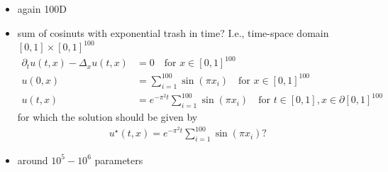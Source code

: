 \begin{itemize}
    \item again 100D
    \item sum of cosinuts with exponential trash in time? I.e.,
    time-space domain $[0,1]\times[0,1]^{100}$ %
    \begin{align*}
        \partial_t u(t,x)-\Delta_x u(t,x) & = 0 \quad \text{for } x\in [0,1]^{100} \\
        u(0,x) & = \sum_{i=1}^{100} \sin(\pi x_i) \quad \text{for }
        x\in [0,1]^{100}
        \\
        u(t,x) & = e^{-\pi^2 t}\sum_{i=1}^{100} \sin(\pi x_i) \quad \text{for } t\in[0,1], x\in\partial[0,1]^{100}
    \end{align*}
    for which the solution should be given by
    \begin{align*}
        u^\star(t,x) = e^{-\pi^2 t} \sum_{i=1}^{100} \sin(\pi x_i)?
    \end{align*}
    \item around $10^5-10^6$ parameters
\end{itemize}

